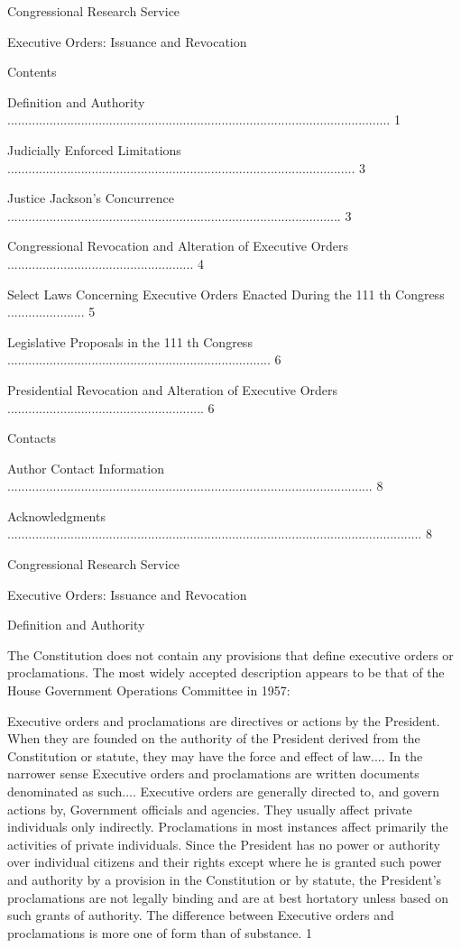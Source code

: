 \documentclass[11pt,a4paper]{article}
\begin{document}
Congressional Research Service

Executive Orders: Issuance and Revocation

Contents

Definition and Authority ............................................................................................................. 1

Judicially Enforced Limitations ................................................................................................... 3

Justice Jackson's Concurrence ............................................................................................... 3

Congressional Revocation and Alteration of Executive Orders ..................................................... 4

Select Laws Concerning Executive Orders Enacted During the 111 th Congress ...................... 5

Legislative Proposals in the 111 th Congress ........................................................................... 6

Presidential Revocation and Alteration of Executive Orders ........................................................ 6

Contacts

Author Contact Information ........................................................................................................ 8

Acknowledgments ...................................................................................................................... 8

Congressional Research Service

Executive Orders: Issuance and Revocation

Definition and Authority

The Constitution does not contain any provisions that define executive orders or proclamations. The most widely accepted description appears to be that of the House Government Operations Committee in 1957:

Executive orders and proclamations are directives or actions by the President. When they are founded on the authority of the President derived from the Constitution or statute, they may have the force and effect of law.... In the narrower sense Executive orders and proclamations are written documents denominated as such.... Executive orders are generally directed to, and govern actions by, Government officials and agencies. They usually affect private individuals only indirectly. Proclamations in most instances affect primarily the activities of private individuals. Since the President has no power or authority over individual citizens and their rights except where he is granted such power and authority by a provision in the Constitution or by statute, the President's proclamations are not legally binding and are at best hortatory unless based on such grants of authority. The difference between Executive orders and proclamations is more one of form than of substance. 1
\end{document}
